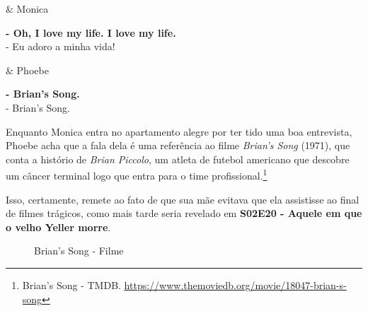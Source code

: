 \begin{tcolorbox}[enhanced,center upper,
    drop fuzzy shadow southeast, boxrule=0.3pt,
    lower separated=false,
    colframe=black!30!dialogoBorder,colback=white]
\begin{minipage}[c]{0.16\linewidth}
   & \centering \scriptsize{Monica}
\end{minipage}
\hfill
\begin{minipage}[c]{0.8\linewidth}
  \textbf{- Oh, I love my life. I love my life.}\\
  - Eu adoro a minha vida!
\end{minipage}

\medskip
\begin{minipage}[c]{0.16\linewidth}
   & \centering \scriptsize{Phoebe}
\end{minipage}
\hfill
\begin{minipage}[c]{0.8\linewidth}
  \textbf{- Brian's Song.}\\
  - Brian's Song.
\end{minipage}
\end{tcolorbox}

Enquanto Monica entra no apartamento alegre por ter tido uma boa
entrevista, Phoebe acha que a fala dela é uma referência ao filme
\emph{Brian's Song} (1971), que conta a histório de \emph{Brian
Piccolo}, um atleta de futebol americano que descobre um câncer terminal
logo que entra para o time profissional.\footnote{\sloppy Brian’s Song - TMDB. \url{https://www.themoviedb.org/movie/18047-brian-s-song}}

Isso, certamente, remete ao fato de que sua mãe evitava que ela
assistisse ao final de filmes trágicos, como mais tarde seria revelado
em
\textbf{\textcolor{primarycolor}{S02E20 - Aquele em que o velho Yeller morre}}.

\begin{figure}
  \centering
    \caption{Brian’s Song - Filme\label{fig:brian-s-song-filme}}
\end{figure}

